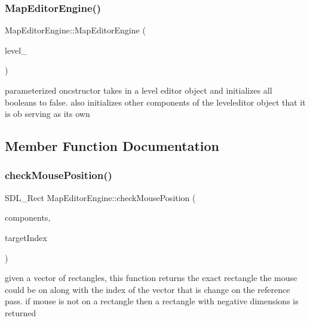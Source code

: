 \subsubsection{\texorpdfstring{Map\+Editor\+Engine()}{MapEditorEngine()}}
{\footnotesize\ttfamily Map\+Editor\+Engine\+::\+Map\+Editor\+Engine (\begin{DoxyParamCaption}\item[{\hyperlink{class_level_editor}{Level\+Editor} $\ast$}]{level\+\_\+ }\end{DoxyParamCaption})}

parameterized oncstructor takes in a level editor object and initializes all booleans to false. also initializes other components of the leveleditor object that it is ob serving as its own 

\subsection{Member Function Documentation}
\hypertarget{class_map_editor_engine_ab516d7b076e7353671374bf580211989}{}\label{class_map_editor_engine_ab516d7b076e7353671374bf580211989} 
\subsubsection{\texorpdfstring{check\+Mouse\+Position()}{checkMousePosition()}}
{\footnotesize\ttfamily S\+D\+L\+\_\+\+Rect Map\+Editor\+Engine\+::check\+Mouse\+Position (\begin{DoxyParamCaption}\item[{std\+::vector$<$ S\+D\+L\+\_\+\+Rect $>$}]{components,  }\item[{int $\ast$}]{target\+Index }\end{DoxyParamCaption})}

given a vector of rectangles, this function returns the exact rectangle the mouse could be on along with the index of the vector that is change on the reference pass. if mouse is not on a rectangle then a rectangle with negative dimensions is returned \hypertarget{class_map_editor_engine_a1e66d4cb755d33fb9ca29d6fa80b544a}{}\label{class_map_editor_engine_a1e66d4cb755d33fb9ca29d6fa80b544a} 
